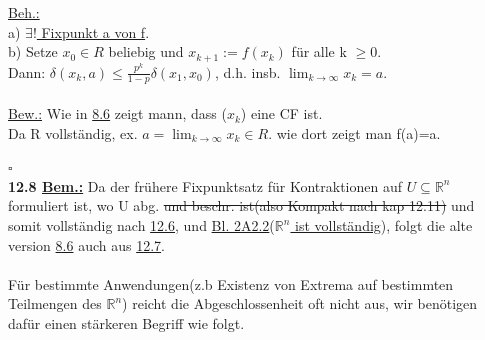 \documentclass[]{scrartcl}
\newcommand{\redcircle}[1]{%
	\tikz[baseline=(char.base)]{
		\node[shape=circle, draw=red, text=red, thick, inner sep=1pt] (char) 
		{\textbf{#1}};
	}%
}
\begin{document}
	\underline{Beh.:} \\
	a) \ul{$\exists!$ Fixpunkt a von f}.\\
	b) Setze \ul{$x_0 \in R$} beliebig und \ul{$x_{k+1} := f(x_k)$} für alle k $\geq$0.\\
	Dann: \ul{$\delta(x_k,a) \leq \frac{p^k}{1-p}\delta(x_1,x_0)$}, d.h. insb. \ul{$\lim_{k\rightarrow\infty}x_k=a$}.\\
	\\
	\underline{Bew.:} Wie in  \ul{8.6} zeigt mann, dass ($x_k$) eine CF ist.\\
	Da R vollständig, ex. $a=\lim_{k\rightarrow\infty}x_k \in R.$ wie dort zeigt man f(a)=a.\\
	\strut\hfill$\square$\\
	\textbf{12.8 \underline{Bem.:}} Da der frühere Fixpunktsatz für Kontraktionen auf $U \subseteq \mathbb{R}^n$ formuliert ist, wo U abg. \sout{und beschr. ist(also Kompakt nach kap 12.11)} und somit vollständig nach \ul{12.6}, und \ul{\redcircle{Ü} Bl. 2A2.2}(\ul{$\mathbb{R}^n$ ist vollständig}), folgt die alte version  \ul{8.6} auch aus \ul{12.7}.\\
	\\
	Für bestimmte Anwendungen(z.b Existenz von Extrema auf bestimmten Teilmengen des $\mathbb{R}^n$) reicht die Abgeschlossenheit oft nicht aus, wir benötigen dafür einen stärkeren Begriff wie folgt.\\
	\\
	
	
	
	
	
	
\end{document}
